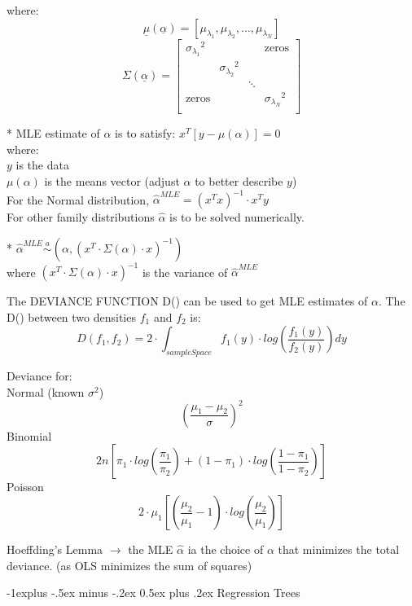 \documentclass[10pt,landscape]{article}
\makeatletter
\renewcommand{\subsection}{\@startsection{subsection}{2}{0mm}%
                                {-1explus -.5ex minus -.2ex}%
                                {0.5ex plus .2ex}%
                                {\normalfont\normalsize\bfseries}}
\makeatother
\begin{document}
\begin{multicols}{3}
where:
$$ \underline{\mu} (\underline{\alpha}) = [\mu_{\lambda_1}, \mu_{\lambda_2}, \hdots, \mu_{\lambda_N}] $$
$$ \Sigma (\underline{\alpha}) = \begin{bmatrix}
 {\sigma_{\lambda_1}}^2 &  &  & \text{zeros} \\
   & {\sigma_{\lambda_2}}^2 &  &  \\
   &  & \ddots &  \\
 \text{zeros} &  &  & {\sigma_{\lambda_N}}^2 \\
\end{bmatrix} $$

\medskip
* MLE estimate of $\alpha$ is to satisfy: $x^T [y - \mu (\alpha)] = 0$ \\
where: \\
$y$ is the data \\
$\mu (\alpha)$ is the means vector (adjust $\alpha$ to better describe $y$) \\
For the Normal distribution, ${\hat{\alpha}}^{MLE} = (x^T x)^{-1} \cdot x^T y$ \\
For other family distributions $\hat{\alpha}$ is to be solved numerically.

\medskip
* ${\hat{\alpha}}^{MLE} \stackrel{a}{\sim} (\alpha, (x^T \cdot \Sigma (\alpha) \cdot x)^{-1})$ \\
where $(x^T \cdot \Sigma (\alpha) \cdot x)^{-1} $ is the variance of ${\hat{\alpha}}^{MLE}$

\medskip
The DEVIANCE FUNCTION D() can be used to get MLE estimates of $\alpha$. The D() between two densities $f_1$ and $f_2$ is: $$ D(f_1, f_2) = 2 \cdot \int_{sampleSpace} f_1 (y) \cdot log \left( \frac{f_1 (y)}{f_2 (y)} \right) dy $$

\medskip
Deviance for: \\
Normal (known $\sigma^2$) $$ \left( \frac{\mu_1 - \mu_2}{\sigma} \right)^2 $$
Binomial $$ 2 n \left[ \pi_1 \cdot log \left( \frac{\pi_1}{\pi_2} \right) + (1 - \pi_1) \cdot log \left( \frac{1 - \pi_1}{1 - \pi_2} \right) \right] $$
Poisson $$ 2 \cdot \mu_1 \left[ \left(\frac{\mu_2}{\mu_1} - 1\right) \cdot log \left(\frac{\mu_2}{\mu_1}\right) \right] $$

\medskip
Hoeffding's Lemma $\rightarrow$ the MLE $\hat{\alpha}$ ia the choice of $\alpha$ that minimizes the total deviance. (as OLS minimizes the sum of squares)

\subsection{Regression Trees} %


\end{multicols}
\end{document}
